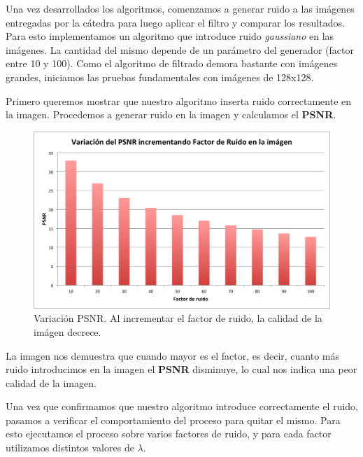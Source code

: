 \documentclass[a4paper]{article}
\begin{document}
Una vez desarrollados los algoritmos, comenzamos a generar ruido a las imágenes entregadas por la cátedra para luego aplicar el filtro y comparar los resultados. Para esto implementamos un algoritmo que introduce ruido \textit{gaussiano} en las imágenes. La cantidad del mismo depende de un parámetro del generador (factor entre 10 y 100). Como el algoritmo de filtrado demora bastante con imágenes grandes, iniciamos las pruebas fundamentales con imágenes de 128x128. \vspace{1em}

Primero queremos mostrar que nuestro algoritmo inserta ruido correctamente en la imagen. Procedemos a generar ruido en la imagen y calculamos el \textbf{PSNR}. 

\begin{figure}[H]
  \centering
  \includegraphics[scale=0.75]{graficos/VariacionPSNR.png}
  \caption{ Variación PSNR. Al incrementar el factor de ruido, la calidad de la imágen decrece. }
\end{figure}

La imagen nos demuestra que cuando mayor es el factor, es decir, cuanto más ruido introducimos en la imagen el \textbf{PSNR} disminuye, lo cual nos indica una peor calidad de la imagen. 


Una vez que confirmamos que nuestro algoritmo introduce correctamente el ruido, pasamos a verificar el comportamiento del proceso para quitar el mismo. Para esto ejecutamos el proceso sobre varios factores de ruido, y para cada factor utilizamos distintos valores de $\lambda$.
\end{document}
